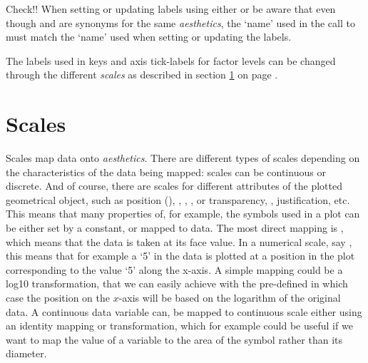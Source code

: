 \documentclass[krantz2]{krantz}\usepackage{knitr}%
\begin{document}
\begin{knitrout}\footnotesize
{}\color{fgcolor}\begin{kframe}
\begin{alltt}
 \hlstd{(} \hlstd{=} \hlstd{,}
                       \hlstd{=} \hlstd{,}
                       \hlstd{=} \hlstd{,}
                       \hlstd{=} \hlstd{))}
\end{alltt}
\end{kframe}
\end{knitrout}

\begin{warningbox}
Check!!
When setting or updating labels using either  or  be aware that even though  and  are synonyms for the same \emph{aesthetics}, the `name' used in the call to  must match the  `name' used when setting or updating the labels.
\end{warningbox}

The labels used in keys and axis tick-labels for factor levels can be changed through the different \emph{scales} as described in section \ref{sec:plot:scales} on page \pageref{sec:plot:scales}.


\section{Scales}\label{sec:plot:scales}

Scales map data onto \emph{aesthetics}. There are different types of scales depending on the characteristics of the data being mapped: scales can be continuous or discrete. And of course, there are scales for different attributes of the plotted geometrical object, such as position (), , , ,  or transparency, , justification, etc. This means that many properties of, for example, the symbols used in a plot can be either set by a constant, or mapped to data. The most direct mapping is , which means that the data is taken at its face value. In a numerical scale, say , this means that for example a `5' in the data is plotted at a position in the plot corresponding to the value `5' along the x-axis. A simple mapping could be a log10 transformation, that we can easily achieve with the pre-defined  in which case the position on the $x$-axis will be based on the logarithm of the original data. A continuous data variable can, be mapped to continuous scale either using an identity mapping or transformation, which for example could be useful if we want to map the value of a variable to the area of the symbol rather than its diameter.
\end{document}
